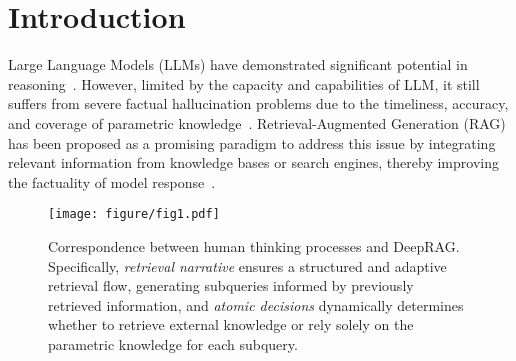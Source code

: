 \section{Introduction}

Large Language Models (LLMs) have demonstrated significant potential in reasoning~\cite{plaat2024reasoning}.
However, limited by the capacity and capabilities of LLM, it still suffers from severe factual hallucination problems due to the timeliness, accuracy, and coverage of parametric knowledge~\cite{zhang2023hallucination,huang2023survey}.
Retrieval-Augmented Generation (RAG) has been proposed as a promising paradigm to address this issue by integrating relevant information from knowledge bases or search engines, thereby improving the factuality of model response~\cite{zhao2024retrieval}.


\begin{figure}[t]
    \centering
    \texttt{[image: figure/fig1.pdf]}
\caption{Correspondence between human thinking processes and DeepRAG.
Specifically, \textit{retrieval narrative} ensures a structured and adaptive retrieval flow, generating subqueries informed by previously retrieved information, and
\textit{atomic decisions} dynamically determines whether to retrieve external knowledge or rely solely on the parametric knowledge for each subquery.}

    \label{fig:comparison}
\end{figure}



